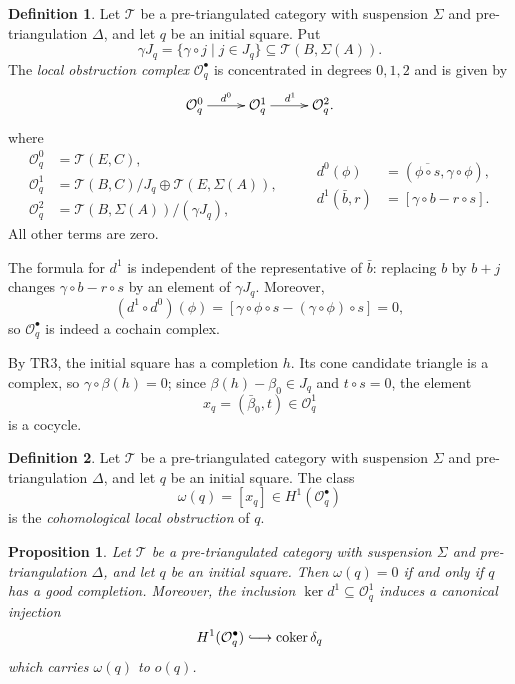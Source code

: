 \documentclass[a4paper,11pt,reqno]{amsart}
\newtheorem{proposition}[proposition]{Proposition}
\theoremstyle{definition}
\newtheorem{definition}[definition]{Definition}
\theoremstyle{plain}
\numberwithin{equation}{section}
\newcommand{\T}{\mathcal T}
\newcommand{\coker}{\operatorname{coker}}
\begin{document}
\begin{definition}
\label{def:local-obstruction-complex}
Let \(\T\) be a pre-triangulated category with suspension \(\Sigma\) and
pre-triangulation \(\Delta\), and let \(q\) be an initial square.  Put
\[
 \gamma J_q=\{\gamma\circ j\mid j\in J_q\}\subseteq
 \T(B,\Sigma(A)).
\]
The \emph{local obstruction complex} $\mathcal O_q^\bullet$ is concentrated
in degrees $0,1,2$ and is given by
\begin{equation*}
\xymatrix@C=2.2pc{
\mathcal O_q^0\ar[r]^{d^0}&\mathcal O_q^1\ar[r]^{d^1}&\mathcal O_q^2.
}
\end{equation*}
where
\[
 \begin{aligned}
 \mathcal O_q^0&=\T(E,C),\\
 \mathcal O_q^1&=\T(B,C)/J_q\oplus\T(E,\Sigma(A)),\\
 \mathcal O_q^2&=\T(B,\Sigma(A))/(\gamma J_q),
 \end{aligned}
 \qquad
 \begin{aligned}
 d^0(\phi)&=(\overline{\phi\circ s},\gamma\circ\phi),\\
 d^1(\bar b,r)&=[\gamma\circ b-r\circ s].
 \end{aligned}
\]
All other terms are zero.
\end{definition}

The formula for $d^1$ is independent of the representative of $\bar b$:
replacing $b$ by $b+j$ changes $\gamma\circ b-r\circ s$ by an element of
$\gamma J_q$.  Moreover,
\[
 (d^1\circ d^0)(\phi)
 =[\gamma\circ\phi\circ s-(\gamma\circ\phi)\circ s]=0,
\]
so $\mathcal O_q^\bullet$ is indeed a cochain complex.

By $\mathrm{TR3}$, the initial square has a completion $h$.  Its cone
candidate triangle is a complex, so $\gamma\circ\beta(h)=0$; since
$\beta(h)-\beta_0\in J_q$ and $t\circ s=0$, the element
\[
 x_q=(\bar\beta _0,t)\in\mathcal O_q^1
\]
is a cocycle.

\begin{definition}
\label{def:cohomological-local-obstruction}
Let \(\T\) be a pre-triangulated category with suspension \(\Sigma\) and
pre-triangulation \(\Delta\), and let \(q\) be an initial square.  The class
\[
 \omega(q)=[x_q]\in H^1(\mathcal O_q^\bullet)
\]
is the \emph{cohomological local obstruction} of $q$.
\end{definition}

\begin{proposition}
\label{prop:local-obstruction-complex}
Let \(\T\) be a pre-triangulated category with suspension \(\Sigma\) and
pre-triangulation \(\Delta\), and let \(q\) be an initial square.  Then
\(\omega(q)=0\) if and only if \(q\) has a good
completion.  Moreover, the inclusion
$\ker d^1\subseteq\mathcal O_q^1$ induces a canonical injection
\[
 H^1(\mathcal O_q^\bullet)\lhook\joinrel\longrightarrow
 \coker\delta_q
\]
which carries $\omega(q)$ to $o(q)$.
\end{proposition}
\end{document}
